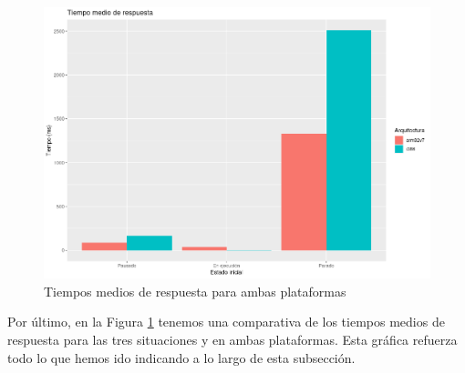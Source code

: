 \begin{figure}
    \centering
    \includegraphics[width=\textwidth]{images/response-time/mean.png}
    \caption{Tiempos medios de respuesta para ambas plataformas}
    \label{fig:response-time-mean}
\end{figure}

Por último, en la Figura \ref{fig:response-time-mean} tenemos una comparativa de
los tiempos medios de respuesta para las tres situaciones y en ambas
plataformas. Esta gráfica refuerza todo lo que hemos ido indicando a lo largo de
esta subsección.
